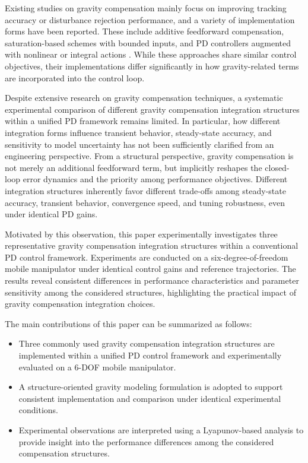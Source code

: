 \documentclass[conference]{IEEEtran}
\begin{document}
Existing studies on gravity compensation mainly focus on improving tracking accuracy or disturbance rejection performance, and a variety of implementation forms have been reported. These include additive feedforward compensation, saturation-based schemes with bounded inputs, and PD controllers augmented with nonlinear or integral actions \cite{b5,b6,b7,b8,b9}. While these approaches share similar control objectives, their implementations differ significantly in how gravity-related terms are incorporated into the control loop.

Despite extensive research on gravity compensation techniques, a systematic experimental comparison of different gravity compensation integration structures within a unified PD framework remains limited. In particular, how different integration forms influence transient behavior, steady-state accuracy, and sensitivity to model uncertainty has not been sufficiently clarified from an engineering perspective. From a structural perspective, gravity compensation is not merely an additional feedforward term, but implicitly reshapes the closed-loop error dynamics and the priority among performance objectives. Different integration structures inherently favor different trade-offs among steady-state accuracy, transient behavior, convergence speed, and tuning robustness, even under identical PD gains.


Motivated by this observation, this paper experimentally investigates three representative gravity compensation integration structures within a conventional PD control framework. Experiments are conducted on a six-degree-of-freedom mobile manipulator under identical control gains and reference trajectories. The results reveal consistent differences in performance characteristics and parameter sensitivity among the considered structures, highlighting the practical impact of gravity compensation integration choices.



The main contributions of this paper can be summarized as follows:
\begin{itemize}
	\item Three commonly used gravity compensation integration structures are implemented within a unified PD control framework and experimentally evaluated on a 6-DOF mobile manipulator.
	
	\item A structure-oriented gravity modeling formulation is adopted to support consistent implementation and comparison under identical experimental conditions.
	
	\item Experimental observations are interpreted using a Lyapunov-based analysis to provide insight into the performance differences among the considered compensation structures.
\end{itemize}
\end{document}
